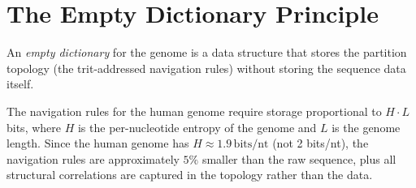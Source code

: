 \section{The Empty Dictionary Principle}
\label{sec:empty_dictionary}

\begin{definition}
\label{def:empty_dictionary}
An \emph{empty dictionary} for the genome is a data structure that stores
the partition topology (the trit-addressed navigation rules) without storing
the sequence data itself.
\end{definition}

\begin{theorem}
\label{thm:empty_dict}
The navigation rules for the human genome require storage proportional to
$H \cdot L$ bits, where $H$ is the per-nucleotide entropy of the genome and
$L$ is the genome length. Since the human genome has $H \approx 1.9\,\mathrm{bits/nt}$
(not 2 bits/nt), the navigation rules are approximately $5\%$ smaller than
the raw sequence, plus all structural correlations are captured in the
topology rather than the data.
\end{theorem}


